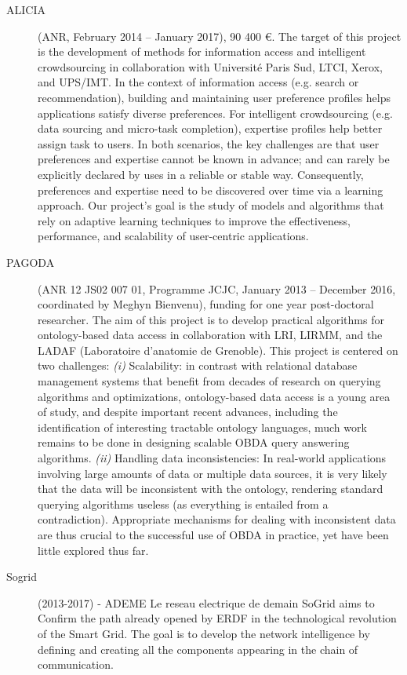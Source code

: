 \begin{description}
\item[ALICIA] (ANR, February 2014 -- January 2017), 90 400 \euro.
The target of this project is the development of methods for information access and intelligent crowdsourcing in collaboration with Université Paris Sud, LTCI, Xerox, and UPS/IMT. In the context of information access (e.g. search or recommendation), building and maintaining user preference profiles helps applications satisfy diverse preferences. For intelligent crowdsourcing (e.g. data sourcing and micro-task completion), expertise profiles help better assign task to users. In both scenarios, the key challenges are that user preferences and expertise cannot be known in advance; and can rarely be explicitly declared by uses in a reliable or stable way. Consequently, preferences and expertise need to be discovered over time via a learning approach. Our project’s goal is the study of models and algorithms that rely on adaptive learning techniques to improve the effectiveness, performance, and scalability of user-centric applications.

\item[PAGODA] (ANR 12 JS02 007 01, Programme JCJC, January 2013 -- December 2016, coordinated by Meghyn Bienvenu), funding for one year post-doctoral researcher.
The aim of this project is to develop practical algorithms for ontology-based data access in collaboration with LRI, LIRMM, and the LADAF (Laboratoire d’anatomie de Grenoble). This project is centered on two challenges:
\textit{(i)} Scalability: in contrast with relational database management systems that benefit from decades of research on querying algorithms and optimizations, ontology-based data access is a young area of study, and despite important recent advances, including the identification of interesting tractable ontology languages, much work remains to be done in designing scalable OBDA query answering algorithms.
\textit{(ii)} Handling data inconsistencies: In real-world applications involving large amounts of data or multiple data sources, it is very likely that the data will be inconsistent with the ontology, rendering standard querying algorithms useless (as everything is entailed from a contradiction). Appropriate mechanisms for dealing with inconsistent data are thus crucial to the successful use of OBDA in practice, yet have been little explored thus far.


\item[Sogrid]  (2013-2017) - ADEME Le reseau  electrique de demain
SoGrid aims to Confirm the path already opened by ERDF in the technological revolution of the Smart Grid. The goal is to develop the network intelligence by defining and creating all the components appearing in the chain of communication.



\end{description}
